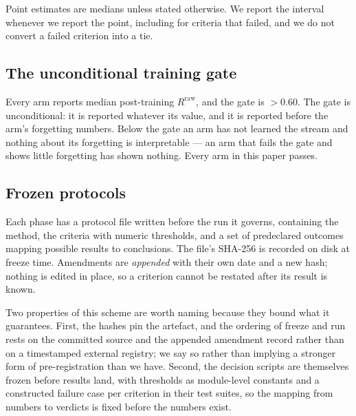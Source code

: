 Point estimates are medians unless stated otherwise. We report the interval
whenever we report the point, including for criteria that failed, and we do not
convert a failed criterion into a tie.

\subsection{The unconditional training gate}
\label{app:gate}

Every arm reports median post-training $R^{\mathrm{raw}}$, and the gate is
$>0.60$. The gate is unconditional: it is reported whatever its value, and it is
reported before the arm's forgetting numbers. Below the gate an arm has not learned
the stream and nothing about its forgetting is interpretable --- an arm that fails
the gate and shows little forgetting has shown nothing. Every arm in this paper
passes.

\subsection{Frozen protocols}
\label{app:protocols}

Each phase has a protocol file written before the run it governs, containing the
method, the criteria with numeric thresholds, and a set of predeclared outcomes
mapping possible results to conclusions. The file's SHA-256 is recorded on disk at
freeze time. Amendments are \emph{appended} with their own date and a new hash;
nothing is edited in place, so a criterion cannot be restated after its result is
known.

Two properties of this scheme are worth naming because they bound what it
guarantees. First, the hashes pin the artefact, and the ordering of freeze and run
rests on the committed source and the appended amendment record rather than on a
timestamped external registry; we say so rather than implying a stronger form of
pre-registration than we have. Second, the decision scripts are themselves frozen
before results land, with thresholds as module-level constants and a constructed
failure case per criterion in their test suites, so the mapping from numbers to
verdicts is fixed before the numbers exist.

